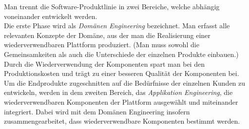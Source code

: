 Man trennt die Software-Produktlinie in zwei Bereiche, welche abhängig voneinander entwickelt werden.\\

Die erste Phase wird als \textit{Domänen Engineering} bezeichnet. Man erfasst alle relevanten Konzepte der Domäne, aus der 
man die Realisierung einer wiederverwendbaren Plattform produziert. (Man muss sowohl die Gemeinsamkeiten als auch die 
Unterschiede der einzelnen Produkte einbauen.) Durch die Wiederverwendung der Komponenten spart man bei den
Produktionskosten und trägt zu einer besseren Qualität der Komponenten bei.\\

Um die Endprodukte zugeschnitten auf die Bedürfnisse der einzelnen Kunden zu entwickeln, 
werden in dem zweiten Bereich, das \textit{Applikation Engineering}, die wiederverwendbaren Komponenten der Plattform 
ausgewählt und miteinander integriert. Dabei wird mit dem Domänen Engineering insofern zusammengearbeitet, 
dass wiederverwendbare Komponenten bestimmt werden.